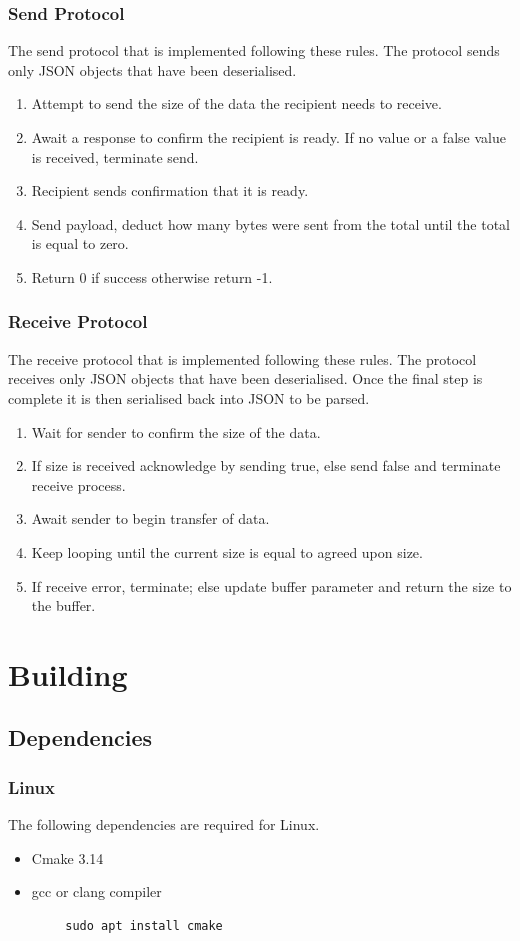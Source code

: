 \documentclass{article}
\begin{document}
\subsubsection{Send Protocol}
The send protocol that is implemented following these rules. The protocol sends only JSON objects that have been deserialised.
\begin{enumerate}
    \item Attempt to send the size of the data the recipient needs to receive.
    \item Await a response to confirm the recipient is ready. If no value or a false value is received, terminate send.
    \item Recipient sends confirmation that it is ready.
    \item Send payload, deduct how many bytes were sent from the total until the total is equal to zero.
    \item Return 0 if success otherwise return -1.
\end{enumerate}
\subsubsection{Receive Protocol}
The receive protocol that is implemented following these rules. The protocol receives only JSON objects that have been deserialised. Once the final step is complete it is then serialised back into JSON to be parsed.
\begin{enumerate}
    \item Wait for sender to confirm the size of the data.
    \item If size is received acknowledge by sending true, else send false and terminate receive process.
    \item Await sender to begin transfer of data.
    \item Keep looping until the current size is equal to agreed upon size.
    \item If receive error, terminate; else update buffer parameter and return the size to the buffer.
\end{enumerate}
\section{Building}
\subsection{Dependencies}
\subsubsection*{Linux}
The following dependencies are required for Linux.
\begin{itemize}
    \item Cmake 3.14
    \item gcc or clang compiler
\end{itemize}
\begin{lstlisting}
        sudo apt install cmake
\end{lstlisting}
\end{document}
